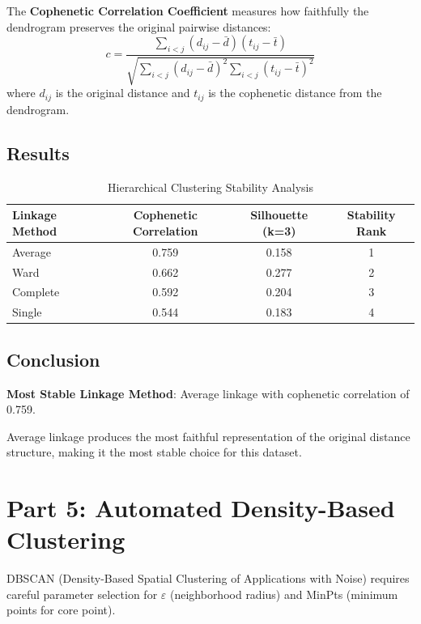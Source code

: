 \documentclass[12pt,a4paper]{article}
\begin{document}
The \textbf{Cophenetic Correlation Coefficient} measures how faithfully the dendrogram preserves the original pairwise distances:
\[
c = \frac{\sum_{i<j}(d_{ij} - \bar{d})(t_{ij} - \bar{t})}{\sqrt{\sum_{i<j}(d_{ij} - \bar{d})^2 \sum_{i<j}(t_{ij} - \bar{t})^2}}
\]
where $d_{ij}$ is the original distance and $t_{ij}$ is the cophenetic distance from the dendrogram.

\subsection{Results}

\begin{table}[H]
\centering
\caption{Hierarchical Clustering Stability Analysis}
\label{tab:hierarchical}
\begin{tabular}{lccc}
\toprule
\textbf{Linkage Method} & \textbf{Cophenetic Correlation} & \textbf{Silhouette (k=3)} & \textbf{Stability Rank} \\
\midrule
Average & 0.759 & 0.158 & 1 \\
Ward & 0.662 & 0.277 & 2 \\
Complete & 0.592 & 0.204 & 3 \\
Single & 0.544 & 0.183 & 4 \\
\bottomrule
\end{tabular}
\end{table}

\subsection{Conclusion}

\textbf{Most Stable Linkage Method}: Average linkage with cophenetic correlation of 0.759.

Average linkage produces the most faithful representation of the original distance structure, making it the most stable choice for this dataset.

\section{Part 5: Automated Density-Based Clustering}

DBSCAN (Density-Based Spatial Clustering of Applications with Noise) requires careful parameter selection for $\varepsilon$ (neighborhood radius) and MinPts (minimum points for core point).
\end{document}

